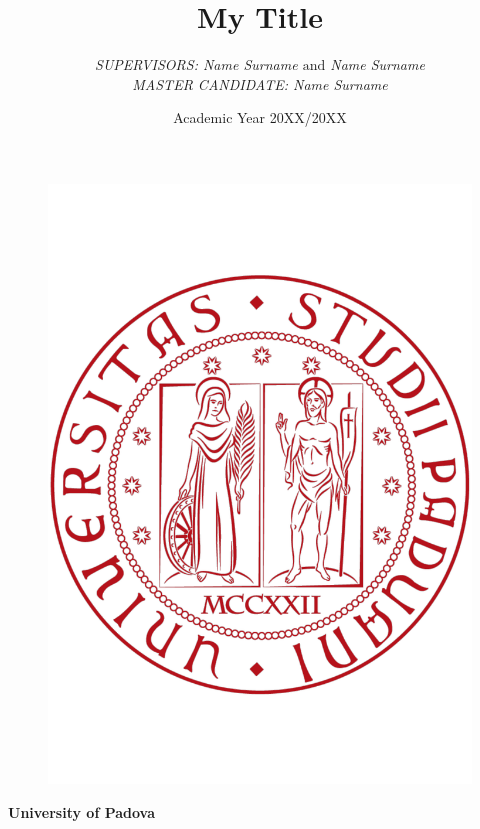 \documentclass[a4paper,11 pt, openright, titlepage]{report}
\title{My Title}
\author{\slshape{SUPERVISORS}: Name Surname $\mathrm{and}$ Name Surname  \\
\slshape{MASTER CANDIDATE}: Name Surname}
\date{Academic Year 20XX/20XX}
\begin{document}
\onehalfspacing    %
\clearpage \thispagestyle{empty}

\begin{titlepage}
\clearpage \thispagestyle{empty} 
\begin{center}
\begin{figure}
\centering
	
	{\includegraphics[scale=0.2]{img/logo_unipd} }
	
	
\end{figure}
\textbf{\Huge University of Padova}\\[1.5cm]
 

\end{center}
\end{titlepage}
\end{document}
